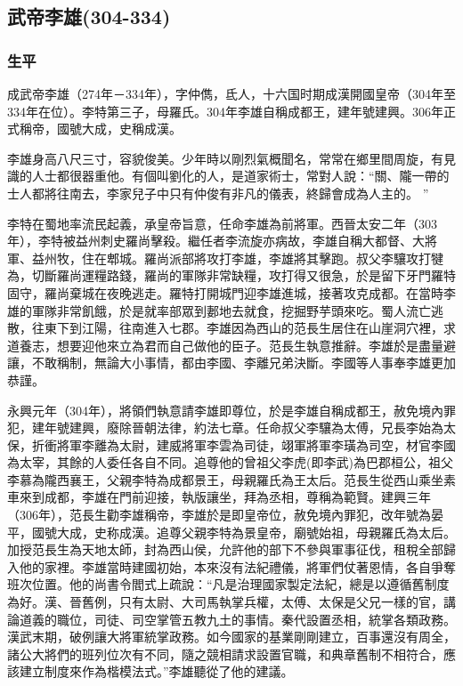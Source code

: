 
\subsection{武帝李雄\tiny(304-334)}

\subsubsection{生平}

成武帝李雄（274年－334年），字仲儁，氐人，十六国时期成漢開國皇帝（304年至334年在位）。李特第三子，母羅氏。304年李雄自稱成都王，建年號建興。306年正式稱帝，國號大成，史稱成漢。

李雄身高八尺三寸，容貌俊美。少年時以剛烈氣概聞名，常常在鄉里間周旋，有見識的人士都很器重他。有個叫劉化的人，是道家術士，常對人說：“關、隴一帶的士人都將往南去，李家兒子中只有仲俊有非凡的儀表，終歸會成為人主的。 ”

李特在蜀地率流民起義，承皇帝旨意，任命李雄為前將軍。西晉太安二年（303年），李特被益州刺史羅尚擊殺。繼任者李流旋亦病故，李雄自稱大都督、大將軍、益州牧，住在郫城。羅尚派部將攻打李雄，李雄將其擊跑。叔父李驤攻打犍為，切斷羅尚運糧路錢，羅尚的軍隊非常缺糧，攻打得又很急，於是留下牙門羅特固守，羅尚棄城在夜晚逃走。羅特打開城門迎李雄進城，接著攻克成都。在當時李雄的軍隊非常飢餓，於是就率部眾到郪地去就食，挖掘野芋頭來吃。蜀人流亡逃散，往東下到江陽，往南進入七郡。李雄因為西山的范長生居住在山崖洞穴裡，求道養志，想要迎他來立為君而自己做他的臣子。范長生執意推辭。李雄於是盡量避讓，不敢稱制，無論大小事情，都由李國、李離兄弟決斷。李國等人事奉李雄更加恭謹。

永興元年（304年），將領們執意請李雄即尊位，於是李雄自稱成都王，赦免境內罪犯，建年號建興，廢除晉朝法律，約法七章。任命叔父李驤為太傅，兄長李始為太保，折衝將軍李離為太尉，建威將軍李雲為司徒，翊軍將軍李璜為司空，材官李國為太宰，其餘的人委任各自不同。追尊他的曾祖父李虎(即李武)為巴郡桓公，祖父李慕為隴西襄王，父親李特為成都景王，母親羅氏為王太后。范長生從西山乘坐素車來到成都，李雄在門前迎接，執版讓坐，拜為丞相，尊稱為範賢。建興三年（306年），范長生勸李雄稱帝，李雄於是即皇帝位，赦免境內罪犯，改年號為晏平，國號大成，史称成漢。追尊父親李特為景皇帝，廟號始祖，母親羅氏為太后。加授范長生為天地太師，封為西山侯，允許他的部下不參與軍事征伐，租稅全部歸入​​他的家裡。李雄當時建國初始，本來沒有法紀禮儀，將軍們仗著恩情，各自爭奪班次位置。他的尚書令閻式上疏說：“凡是治理國家製定法紀，總是以遵循舊制度為好。漢、晉舊例，只有太尉、大司馬執掌兵權，太傅、太保是父兄一樣的官，講論道義的職位，司徒、司空掌管五教九土的事情。秦代設置丞相，統掌各類政務。漢武末期，破例讓大將軍統掌政務。如今國家的基業剛剛建立，百事還沒有周全，諸公大將們的班列位次有不同，隨之競相請求設置官職，和典章舊制不相符合，應該建立制度來作為楷模法式。”李雄聽從了他的建議。

